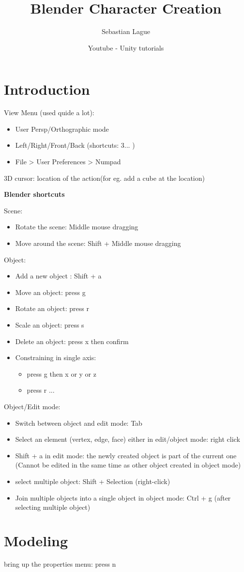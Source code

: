 \documentclass[11pt]{article}
\title{Blender Character Creation}
\author{Sebastian Lague}
\date{Youtube - Unity tutorials}
\begin{document}
\maketitle

\section{Introduction}

View Menu (used quide a lot):
\begin{itemize}
	\item User Persp/Orthographic mode
	\item Left/Right/Front/Back (shortcuts: 3... )
	\item File > User Preferences > Numpad
\end{itemize}


3D cursor: location of the action(for eg. add a cube at the location)

\textbf{Blender shortcuts}

Scene:

\begin{itemize}
\item Rotate the scene: Middle mouse dragging
\item Move around the scene: Shift + Middle mouse dragging
\end{itemize}

Object:

\begin{itemize}
	\item Add a new object : Shift + a
	\item Move an object: press g
	\item Rotate an object: press r
	\item Scale an object: press s
	\item Delete an object: press x then confirm
	\item Constraining in single axis:
	\begin{itemize}
		\item press g then x or y or z
		\item press r ...
	\end{itemize}
\end{itemize}

Object/Edit mode:

\begin{itemize}
\item Switch between object and edit mode: Tab
\item Select an element (vertex, edge, face) either in edit/object mode: right click
\item Shift + a in edit mode: the newly created object is part of the current one (Cannot be edited in the same time as other object created in object mode)
\item select multiple object: Shift + Selection (right-click) 
\item Join multiple objects into a single object in object mode: Ctrl + g (after selecting multiple object)
\end{itemize}

\section{Modeling}

bring up the properties menu: press n
\end{document}
